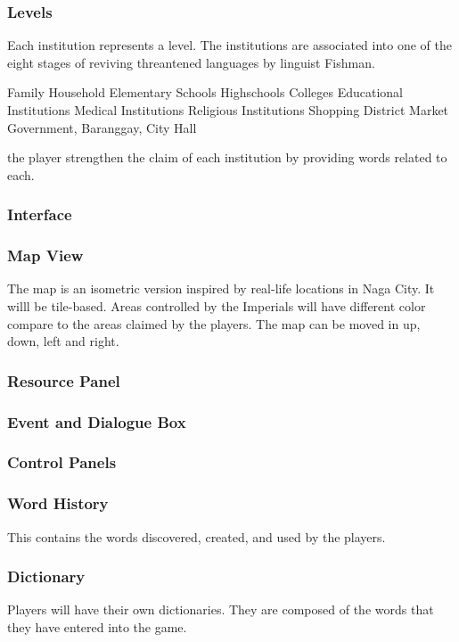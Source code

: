 \documentclass[11pt]{article}
\begin{document}
\subsubsection{Levels}
Each institution represents a level. The institutions are associated into one of the eight stages of reviving threantened languages by linguist Fishman.


Family Household
Elementary Schools
Highschools
Colleges
Educational Institutions
Medical Institutions
Religious Institutions
Shopping District
Market
Government, Baranggay, City Hall

the player strengthen the claim of each institution by providing words related to each.

\subsubsection{Interface}

\subsubsection{Map View}
The map is an isometric version inspired by real-life locations in Naga City. It willl be tile-based. Areas controlled by the Imperials will have different color compare to the areas claimed by the players. The map can be moved in up, down, left and right.

\subsubsection{Resource Panel}
\subsubsection{Event and Dialogue Box}
\subsubsection{Control Panels}
\subsubsection{Word History}
This contains the words discovered, created, and used by the players.

\subsubsection{Dictionary}
Players will have their own dictionaries. They are composed of the words that they have entered into the game.
\end{document}
